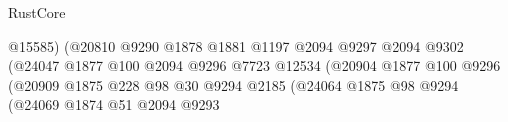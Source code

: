 \begin{lexlean}{RustCore}
\begin{coremodule}
                                                              @15585)
                                                            (@20810
                                                              @9290
                                                              @1878
                                                              @1881
                                                              @1197
                                                              @2094
                                                              @9297
                                                              @2094
                                                              @9302
                                                              (@24047
                                                                @1877
                                                                @100
                                                                @2094
                                                                @9296
                                                                @7723
                                                                @12534
                                                                (@20904
                                                                  @1877
                                                                  @100
                                                                  @9296
                                                                  (@20909
                                                                    @1875
                                                                    @228
                                                                    @98
                                                                    @30
                                                                    @9294
                                                                    @2185
                                                                    (@24064
                                                                      @1875
                                                                      @98
                                                                      @9294
                                                                      (@24069
                                                                        @1874
                                                                        @51
                                                                        @2094
                                                                        @9293

\end{coremodule}
\end{lexlean}
